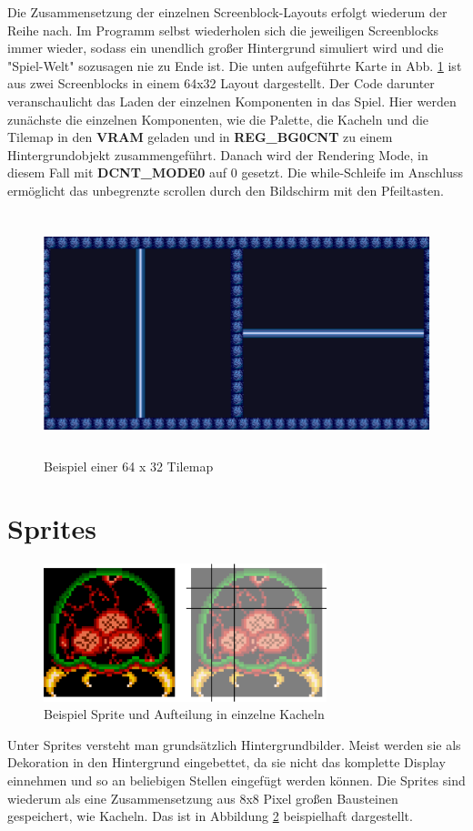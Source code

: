 Die Zusammensetzung der einzelnen Screenblock-Layouts erfolgt wiederum der Reihe nach. Im Programm selbst wiederholen sich die jeweiligen Screenblocks immer wieder, sodass ein unendlich großer Hintergrund simuliert wird und die "Spiel-Welt" sozusagen nie zu Ende ist. Die unten aufgeführte Karte in Abb. \ref{tilemap} ist aus zwei Screenblocks in einem 64x32 Layout dargestellt. Der Code darunter veranschaulicht das Laden der einzelnen Komponenten in das Spiel. Hier werden zunächste die einzelnen Komponenten, wie die Palette, die Kacheln und die Tilemap in den \textbf{\ac{VRAM}} geladen und in \textbf{REG\_BG0CNT} zu einem Hintergrundobjekt zusammengeführt. Danach wird der Rendering Mode, in diesem Fall mit \textbf{DCNT\_MODE0} auf 0 gesetzt. Die while-Schleife im Anschluss ermöglicht das unbegrenzte scrollen durch den Bildschirm mit den Pfeiltasten.
\begin{figure}[h]
	\centering
	\includegraphics[height=70mm]{img/tilemap.png}
	\caption{Beispiel einer 64 x 32 Tilemap}
	\label{tilemap}
\end{figure}


\section{Sprites}
\begin{figure}
	\includegraphics[height=40mm]{img/sprites.png}
	\caption{Beispiel Sprite und Aufteilung in einzelne Kacheln}
	\label{sprites}
\end{figure}
Unter Sprites versteht man grundsätzlich Hintergrundbilder. Meist werden sie als Dekoration in den Hintergrund eingebettet, da sie nicht das komplette Display einnehmen und so an beliebigen Stellen eingefügt werden können. Die Sprites sind wiederum als eine Zusammensetzung aus 8x8 Pixel großen Bausteinen gespeichert, wie Kacheln. Das ist in Abbildung \ref{sprites} beispielhaft dargestellt.

